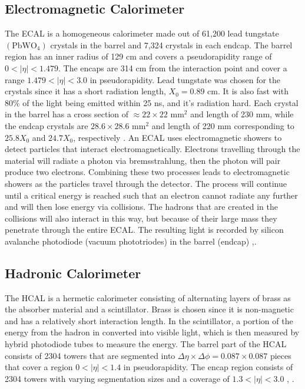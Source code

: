 \subsection{Electromagnetic Calorimeter}
\label{sec:ECAL}

The ECAL is a homogeneous calorimeter made out of 61,200 lead tungstate $(\text{PbWO}_4)$ crystals in the barrel and 7,324 crystals in each endcap. The barrel region has an inner radius of 129 cm and covers a pseudorapidity range of $0<|\eta|<1.479$. The encaps are 314 cm from the interaction point and cover a range $1.479<|\eta|<3.0$ in pseudorapidity. Lead tungstate was chosen for the crystals since it has a short radiation length, $X_0=0.89 \text{ cm}$. It is also fast with 80\% of the light being emitted within 25 ns, and it's radiation hard. Each crystal in the barrel has a cross section of $\approx22\times22 \text{ mm}^2$ and length of 230 mm, while the endcap crystals are $28.6\times28.6 \text{ mm}^2$ and length of 220 mm corresponding to $25.8X_0$ and $24.7X_0$, respectively \cite{noauthor_cms_1997}. An ECAL uses electromagnetic showers to detect particles that interact electromagnetically. Electrons travelling through the material will radiate a photon via bremsstrahlung, then the photon will pair produce two electrons. Combining these two processes leads to electromagnetic showers as the particles travel through the detector. The process will continue until a critical energy is reached such that an electron cannot radiate any further and will then lose energy via collisions. The hadrons that are created in the collisions will also interact in this way, but because of their large mass they penetrate through the entire ECAL. The resulting light is recorded by silicon avalanche photodiode (vacuum phototriodes) in the barrel (endcap) \cite{noauthor_cms_1997},\cite{collaboration_cms_2007}. 

\subsection{Hadronic Calorimeter}
\label{sec:HCAL}

The HCAL is a hermetic calorimeter consisting of alternating layers of brass as the absorber material and a scintillator. Brass is chosen since it is non-magnetic and has a relatively short interaction length. In the scintillator, a portion of the energy from the hadron in converted into visible light, which is then measured by hybrid photodiode tubes to measure the energy. The barrel part of the HCAL consists of 2304 towers that are segmented into $\Delta\eta\times\Delta\phi=0.087\times0.087$ pieces that cover a region $0<|\eta|<1.4$ in pseudorapidity. The encap region consists of 2304 towers with varying segmentation sizes and a coverage of $1.3<|\eta|<3.0$ \cite{noauthor_cms_1997-1}, \cite{collaboration_cms_2007}. 

